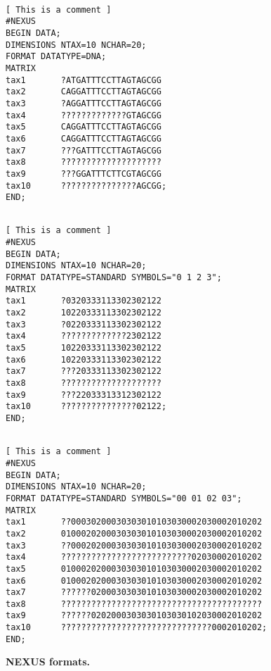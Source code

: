 \documentclass[a4paper,12pt]{article}
\begin{document}
\begin{figure}
\begin{small}
\begin{Verbatim}[frame=single, label=Nexus nucleotides, samepage=true, baselinestretch=0.5]

[ This is a comment ]
#NEXUS
BEGIN DATA;
DIMENSIONS NTAX=10 NCHAR=20;
FORMAT DATATYPE=DNA;
MATRIX
tax1       ?ATGATTTCCTTAGTAGCGG
tax2       CAGGATTTCCTTAGTAGCGG
tax3       ?AGGATTTCCTTAGTAGCGG
tax4       ?????????????GTAGCGG
tax5       CAGGATTTCCTTAGTAGCGG
tax6       CAGGATTTCCTTAGTAGCGG
tax7       ???GATTTCCTTAGTAGCGG
tax8       ????????????????????
tax9       ???GGATTTCTTCGTAGCGG
tax10      ???????????????AGCGG;
END;	                      	                                      	                                      	                  

\end{Verbatim}
\end{small}

\begin{small}
\begin{Verbatim}[frame=single, label=Nexus digits, samepage=true, baselinestretch=0.5]

[ This is a comment ]
#NEXUS
BEGIN DATA;
DIMENSIONS NTAX=10 NCHAR=20;
FORMAT DATATYPE=STANDARD SYMBOLS="0 1 2 3";
MATRIX
tax1       ?0320333113302302122
tax2       10220333113302302122
tax3       ?0220333113302302122
tax4       ?????????????2302122
tax5       10220333113302302122
tax6       10220333113302302122
tax7       ???20333113302302122
tax8       ????????????????????
tax9       ???22033313312302122
tax10      ???????????????02122;
END;	                      	                                      	                                      	                  

\end{Verbatim}
\end{small}

\begin{small}
\begin{Verbatim}[frame=single, label=Nexus digits, samepage=true, baselinestretch=0.5]

[ This is a comment ]
#NEXUS
BEGIN DATA;
DIMENSIONS NTAX=10 NCHAR=20;
FORMAT DATATYPE=STANDARD SYMBOLS="00 01 02 03";
MATRIX
tax1       ??00030200030303010103030002030002010202
tax2       0100020200030303010103030002030002010202
tax3       ??00020200030303010103030002030002010202
tax4       ??????????????????????????02030002010202
tax5       0100020200030303010103030002030002010202
tax6       0100020200030303010103030002030002010202
tax7       ??????0200030303010103030002030002010202
tax8       ????????????????????????????????????????
tax9       ??????0202000303030103030102030002010202
tax10      ??????????????????????????????0002010202;
END;	                      	                                      	                                      	                  

\end{Verbatim}
\end{small}
\caption{\bf NEXUS formats.}\label{fig:nexus}
\end{figure}
\end{document}
